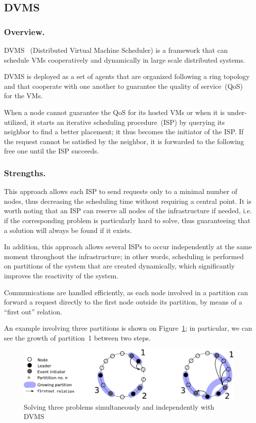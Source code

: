 

\subsection{DVMS}

\subsubsection{Overview.}
DVMS~\cite{quesnel:ispa13,quesnel:cpe12}
(Distributed Virtual Machine Scheduler) is a framework that can schedule VMs
cooperatively and dynamically in large scale distributed
systems.

DVMS is deployed as a set of agents that are organized following a ring
topology and that cooperate with one another to guarantee the quality of
service~(QoS) for the VMs.

When a node cannot guarantee the QoS for its hosted VMs or when it is
under-utilized, it starts an iterative scheduling procedure~(ISP) by querying
its neighbor to find a better placement; it thus becomes the initiator of the ISP.
If the request cannot be satisfied by the neighbor, it is forwarded to the
following free one until the ISP succeeds.

\subsubsection{Strengths.}
This approach allows each ISP to send requests only to a minimal
number of nodes, thus decreasing the scheduling time without requiring a
central point.
%
It is worth noting that an ISP can reserve all nodes of the
infrastructure if needed, i.e. if the corresponding problem is particularly hard to solve, thus
guaranteeing that a solution will always be found if it exists.

In addition, this approach allows several ISPs to occur independently at the
same moment throughout the infrastructure; in other words, scheduling is
performed on partitions of the system that are created dynamically, which
significantly improves the reactivity of the system.

Communications are handled efficiently, as each node involved in a partition
can forward a request directly to the first node outside its partition, by
means of a ``first out'' relation.

An example involving three partitions is shown on Figure~\ref{fig:isp}; in
particular, we can see the growth of partition~1 between two steps.
\begin{figure}[h!]
  \centering
  \includegraphics[width=0.9\linewidth]{Figures/resourceAcquisition-standard.pdf}
  \caption{Solving three problems simultaneously and independently with DVMS}%
  \label{fig:isp}%
\end{figure}

